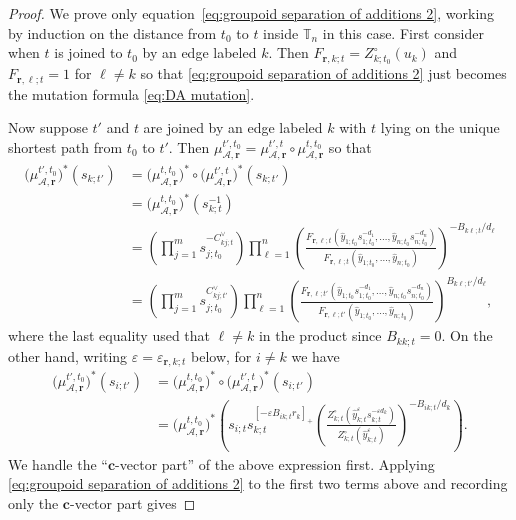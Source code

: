 \documentclass{amsart}
\numberwithin{equation}{section}
\newcommand{\bfc}{\mathbf{c}}
\newcommand{\bfr}{{\boldsymbol{r}}}
\newcommand{\cA}{\mathcal{A}}
\newcommand{\TT}{\mathbb{T}}
\begin{document}
\begin{proof}
  We prove only equation~\eqref{eq:groupoid separation of additions 2}, working by induction on the distance from $t_0$ to $t$ inside $\TT_n$ in this case.
  First consider when $t$ is joined to $t_0$ by an edge labeled $k$.
  Then $F_{\bfr,k;t}=Z_{k;t_0}^\circ(u_k)$ and $F_{\bfr,\ell;t}=1$ for $\ell\ne k$ so that \eqref{eq:groupoid separation of additions 2} just becomes the mutation formula \eqref{eq:DA mutation}.

  Now suppose $t'$ and $t$ are joined by an edge labeled $k$ with $t$ lying on the unique shortest path from $t_0$ to $t'$.
  Then $\mu_{\cA,\bfr}^{t',t_0}=\mu_{\cA,\bfr}^{t',t}\circ\mu_{\cA,\bfr}^{t,t_0}$ so that
  \begin{align*}
    \big(\mu_{\cA,\bfr}^{t',t_0}\big)^*(s_{k;t'})
    &=\big(\mu_{\cA,\bfr}^{t,t_0}\big)^*\circ\big(\mu_{\cA,\bfr}^{t',t}\big)^*(s_{k;t'})\\
    &=\big(\mu_{\cA,\bfr}^{t,t_0}\big)^*(s_{k;t}^{-1})\\
    &=\left(\prod_{j=1}^m s_{j;t_0}^{-C^\vee_{kj;t}}\right) \prod_{\ell=1}^n \left(\frac{F_{\bfr,\ell;t}(\hat y_{1;t_0} s_{1;t_0}^{-d_1},\ldots,\hat y_{n;t_0} s_{n;t_0}^{-d_n})}{F_{\bfr,\ell;t}(\hat y_{1;t_0},\ldots,\hat y_{n;t_0})}\right)^{-B_{k\ell;t}/d_\ell}\\
    &=\left(\prod_{j=1}^m s_{j;t_0}^{C^\vee_{kj;t'}}\right) \prod_{\ell=1}^n \left(\frac{F_{\bfr,\ell;t'}(\hat y_{1;t_0} s_{1;t_0}^{-d_1},\ldots,\hat y_{n;t_0} s_{n;t_0}^{-d_n})}{F_{\bfr,\ell;t'}(\hat y_{1;t_0},\ldots,\hat y_{n;t_0})}\right)^{B_{k\ell;t'}/d_\ell},
  \end{align*}
  where the last equality used that $\ell\ne k$ in the product since $B_{kk;t}=0$.
  On the other hand, writing $\varepsilon=\varepsilon_{\bfr,k;t}$ below, for $i\ne k$ we have
  \begin{align*}
    \big(\mu_{\cA,\bfr}^{t',t_0}\big)^*(s_{i;t'})
    &=\big(\mu_{\cA,\bfr}^{t,t_0}\big)^*\circ\big(\mu_{\cA,\bfr}^{t',t}\big)^*(s_{i;t'})\\
    &=\big(\mu_{\cA,\bfr}^{t,t_0}\big)^*\left(s_{i;t} s_{k;t}^{[-\varepsilon B_{ik;t} r_k]_+} \left(\frac{Z_{k;t}^\circ\left(\hat y_{k;t}^\varepsilon s_{k;t}^{-\varepsilon d_k}\right)}{Z_{k;t}^\circ(\hat y_{k;t}^\varepsilon)}\right)^{-B_{ik;t}/d_k}\right).
  \end{align*}
  We handle the ``$\bfc$-vector part'' of the above expression first.
  Applying \eqref{eq:groupoid separation of additions 2} to the first two terms above and recording only the $\bfc$-vector part gives

\end{proof}
\end{document}

